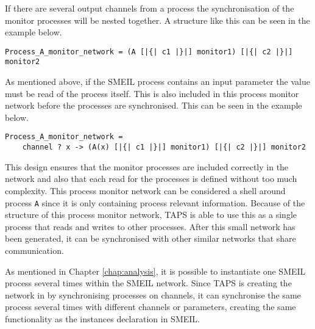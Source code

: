 If there are several output channels from a process the synchronisation of the monitor processes will be nested together. A structure like this can be seen in the example below.
\begin{verbatim}
Process_A_monitor_network = (A [|{| c1 |}|] monitor1) [|{| c2 |}|] monitor2
\end{verbatim}
As mentioned above, if the SMEIL process contains an input parameter the value must be read of the process itself. This is also included in this process monitor network before the processes are synchronised. This can be seen in the example below.
\begin{verbatim}
Process_A_monitor_network =
    channel ? x -> (A(x) [|{| c1 |}|] monitor1) [|{| c2 |}|] monitor2
\end{verbatim}
This design ensures that the monitor processes are included correctly in the network and also that each read for the processes is defined without too much complexity. This process monitor network can be considered a shell around process \texttt{A} since it is only containing process relevant information. Because of the structure of this process monitor network, TAPS is able to use this as a single process that reads and writes to other processes. After this small network has been generated, it can be synchronised with other similar networks that share communication.

As mentioned in Chapter \ref{chap:analysis}, it is possible to instantiate one SMEIL process several times within the SMEIL network. Since TAPS is creating the network in \cspm{} by synchronising processes on channels, it can synchronise the same process several times with different channels or parameters, creating the same functionality as the instances declaration in SMEIL.\\

